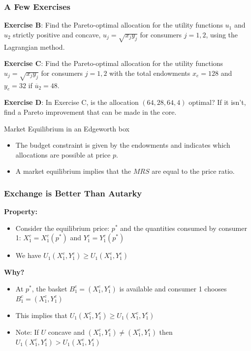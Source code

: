 \documentclass[handout]{beamer}
\newenvironment{iPar}[1]{\textbf{#1} \begin{itemize}}{\end{itemize}}
\newcommand{\mdp}{\medskip \pause}
\begin{document}
\begin{frame}\frametitle{A Few Exercises} 


\textbf{Exercise B}: Find the Pareto-optimal allocation for the utility functions $u_1$ and $u_2$ strictly positive and concave, $u_j = \sqrt{x_j y_j}$ for consumers $j=1,2$, using the Lagrangian method.

\textbf{Exercise C}: Find the Pareto-optimal allocation for the utility functions $u_j = \sqrt{x_j y_j}$ for consumers $j=1,2$ with the total endowments $x_e = 128$ and $y_e=32$ if $\overline{u}_2=48$.

\textbf{Exercise D}: In Exercise C, is the allocation $(64,28,64,4)$ optimal? If it isn't, find a Pareto improvement that can be made in the core. 

\end{frame}

\begin{frame}{Market Equilibrium in an Edgeworth box}
\begin{itemize}
    \item The budget constraint is given by the endowments and indicates which allocations are possible at price $p$. 
    \item A market equilibrium implies that the $MRS$ are equal to the price ratio.
\end{itemize}
\end{frame}

\begin{frame}\frametitle{Exchange is Better Than Autarky}

\begin{iPar}{Property:} \item Consider the equilibrium price: $p^*$ and the quantities consumed by consumer 1: $X^c_1 = X^c_1(p^*)$ and $Y^c_1 = Y^c_1(p^*)$ \item We have $U_1(X^c_1, Y^c_1) \geq U_1(X^e_1, Y^e_1)$
\end{iPar}\mdp

\begin{iPar}{Why?} \item At $p^*$, the basket $B^e_1 = (X^e_1,Y^e_1)$ is available and consumer 1 chooses $B^c_1=(X^c_1, Y^c_1)$ \item This implies that $U_1(X^c_1, Y^c_1) \geq U_1(X^e_1, Y^e_1)$
\pause \item Note: If $U$ concave and $(X^c_1, Y^c_1) \neq (X^e_1,
Y^e_1)$ then $U_1(X^c_1, Y^c_1) > U_1(X^e_1, Y^e_1)$ \end{iPar}

\end{frame}
\end{document}
